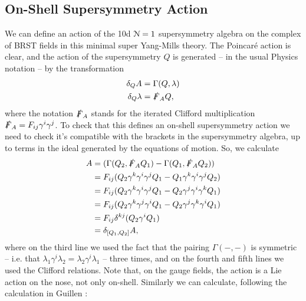 \documentclass[10pt, oneside]{article}
\begin{document}
\subsection{On-Shell Supersymmetry Action}
We can define an action of the 10d $\mathcal{N}=1$ supersymmetry algebra on the complex of BRST fields in this minimal super Yang-Mills theory.  The Poincar\'e action is clear, and the action of the supersymmetry $Q$ is generated -- in the usual Physics notation -- by the transformation \cite{BrinkSchwarzScherk}
\begin{align*}
\delta_Q A &= \Gamma(Q,\lambda) \\
\delta_Q \lambda &= \slashed{F}_A Q,
\end{align*}
where the notation $\slashed{F}_A$ stands for the iterated Clifford multiplication $\slashed{F}_A = F_{ij} \gamma^i \gamma^j$.  To check that this defines an on-shell supersymmetry action we need to check it's compatible with the brackets in the supersymmetry algebra, up to terms in the ideal generated by the equations of motion.  So, we calculate
\begin{align*}
[\delta_{Q_1}, \delta_{Q_2}] A &= (\Gamma(Q_2,\sd F_A Q_1) - \Gamma(Q_1,\sd F_A Q_2)) \\
&=  F_{ij}(Q_2 \gamma^k \gamma^i \gamma^j Q_1 - Q_1 \gamma^k \gamma^i \gamma^j Q_2)\\
&=  F_{ij}(Q_2 \gamma^k \gamma^i \gamma^j Q_1 - Q_2 \gamma^j \gamma^i \gamma^k Q_1)\\
&=  F_{ij}(Q_2 \gamma^k \gamma^j \gamma^i Q_1 - Q_2 \gamma^j \gamma^k \gamma^i Q_1)\\
&=  F_{ij}\delta^{kj}(Q_2 \gamma^i Q_1) \\
&= \delta_{[Q_1, Q_2]} A,
\end{align*}
where on the third line we used the fact that the pairing $\Gamma(-,-)$ is symmetric -- i.e. that $\lambda_1 \gamma^i \lambda_2 = \lambda_2 \gamma^i \lambda_1$ -- three times, and on the fourth and fifth lines we used the Clifford relations.  Note that, on the gauge fields, the action is a Lie action on the nose, not only on-shell.  Similarly we can calculate, following the calculation in Guillen \cite{Guillen}:
\end{document}
